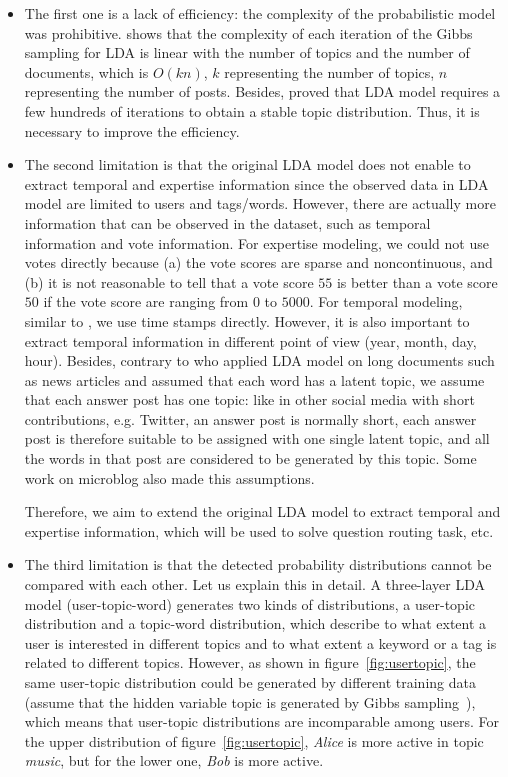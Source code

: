 \begin{itemize}
\item The first one is a lack of efficiency: the complexity of the probabilistic model was prohibitive. \cite{chp7ldatimecomplexity} shows that the complexity of each iteration of the Gibbs sampling for LDA is linear with the number of topics and the number of documents, which is $O(kn)$, $k$ representing the number of topics, $n$ representing the number of posts. Besides, \cite{griffiths2004finding} proved that LDA model requires a few hundreds of iterations to obtain a stable topic distribution. Thus, it is necessary to improve the efficiency.

\item The second limitation is that the original LDA model does not enable to extract temporal and expertise information since the observed data in LDA model are limited to users and tags/words. However, there are actually more information that can be observed in the dataset, such as temporal information and vote information. For expertise modeling, we could not use votes directly because (a) the vote scores are sparse and noncontinuous, and (b) it is not reasonable to tell that a vote score $55$ is better than a vote score $50$ if the vote score are ranging from $0$ to $5000$. For temporal modeling, similar to \cite{wang2006topics} \cite{hu2014user}, we use time stamps directly. However, it is also important to extract temporal information in different point of view (year, month, day, hour).
Besides, contrary to \cite{blei2003latent} who applied LDA model on long documents such as news articles and assumed that each word has a latent topic, we assume  that each answer post has one topic: like in other social media with short contributions, e.g. Twitter, an answer post is normally short, each answer post is therefore suitable to be assigned with one single latent topic, and all the words in that post are considered to be generated by this topic. Some work \cite{chp7zhao2011comparing}\cite{chp7diao2012finding} on microblog also made this assumptions.

Therefore, we aim to extend the original LDA model to extract temporal and expertise information, which will be used to solve question routing task, etc. 



\item The third limitation is that the detected probability distributions cannot be compared with each other.  Let us explain this in detail. A three-layer LDA model (user-topic-word) generates two kinds of distributions, a user-topic distribution and a topic-word distribution, which describe to what extent a user is interested in different topics and to what extent a keyword or a tag is related to different topics. 
However, as shown in figure~\ref{fig:usertopic}, the same user-topic distribution could be generated by different training data (assume that the hidden variable topic is generated by Gibbs sampling~\cite{griffiths2004finding}), which means that user-topic distributions are incomparable among users. For the upper distribution of figure~\ref{fig:usertopic}, \emph{Alice} is more active in topic \emph{music}, but for the lower one, \emph{Bob} is more active. 



\end{itemize}
